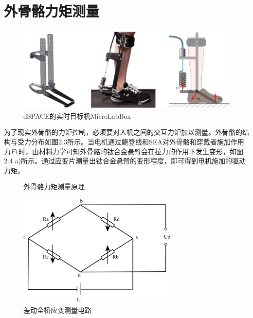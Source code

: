 \section{外骨骼力矩测量}

\begin{figure}[htb]
    \includegraphics[width=14cm]{fig/f23.jpg}
    \caption{dSPACE的实时目标机MicroLabBox}
    \label{fig:mark}
\end{figure}

为了现实外骨骼的力矩控制，必须要对人机之间的交互力矩加以测量。外骨骼的结构与受力分布如图2.3所示。当电机通过鲍登线和SEA对外骨骼和穿戴者施加作用力$F1$时，由材料力学可知外骨骼的钛合金悬臂会在拉力的作用下发生变形，如图2.4 a)所示。通过应变片测量出钛合金悬臂的变形程度，即可得到电机施加的驱动力矩。

\begin{figure}[htb]
    \quad
    \caption{外骨骼力矩测量原理}
    \label{fig:subfigss}
\end{figure}

\begin{figure}[htb]
    \includegraphics[width=8cm]{fig/f25.jpg}
    \caption{差动全桥应变测量电路}
    \label{fig:mark}
\end{figure}

